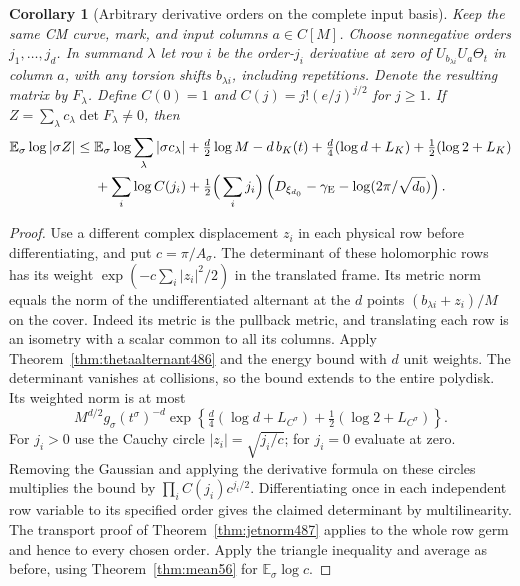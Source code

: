\documentclass[a4paper,11pt]{article}
\newtheorem{corollary}[proposition]{Corollary}
\theoremstyle{definition}
\theoremstyle{remark}
\numberwithin{equation}{section}
\begin{document}
\begin{corollary}[Arbitrary derivative orders on the complete input basis]\leavevmode
\label{cor:arbitraryorders488}
Keep the same CM curve, mark, and input columns \(a\in C[M]\).
Choose nonnegative orders \(j_1,\ldots,j_d\). In summand
\(\lambda\) let row \(i\) be the order-\(j_i\) derivative at zero
of \(U_{b_{\lambda i}}U_a\Theta_t\) in column \(a\), with any
torsion shifts \(b_{\lambda i}\), including repetitions. Denote
the resulting matrix by \(F_\lambda\). Define \(C(0)=1\) and
\(C(j)=j!(e/j)^{j/2}\) for \(j\ge1\). If
\(Z=\sum_\lambda c_\lambda\det F_\lambda\ne0\), then
\[
\begin{aligned}
 \mathbb E_\sigma\log|\sigma Z|\le{}&
 \mathbb E_\sigma\log\sum_\lambda|\sigma c_\lambda|
 +\tfrac d2\log M-d\,b_K(t)
 +\tfrac d4(\log d+L_K)+\tfrac12(\log2+L_K)\\
 &+\sum_i\log C(j_i)
 +\tfrac12\Big(\sum_i j_i\Big)
   \left(D_{\xi_{d_0}}-\gamma_{\rm E}
                         -\log(2\pi/\sqrt{d_0})\right).
\end{aligned}
\]
\end{corollary}
\begin{proof}
Use a different complex displacement \(z_i\) in each physical row
before differentiating, and put \(c=\pi/A_\sigma\).
The determinant of these holomorphic rows has its weight
\(\exp(-c\sum_i|z_i|^2/2)\) in the translated frame.
Its metric norm equals the norm of the undifferentiated
alternant at the \(d\) points \((b_{\lambda i}+z_i)/M\) on the
cover. Indeed its metric is the pullback metric, and translating
each row is an isometry with a scalar common to all its columns.
Apply Theorem~\ref{thm:thetaalternant486} and the energy bound
with \(d\) unit weights. The determinant vanishes at collisions,
so the bound extends to the entire polydisk. Its weighted norm
is at most
\[
 M^{d/2}g_\sigma(t^\sigma)^{-d}
  \exp\!\left\{ \tfrac d4(\log d+L_{C^\sigma})
                     +\tfrac12(\log2+L_{C^\sigma})\right\}.
\]
For \(j_i>0\) use the Cauchy circle \(|z_i|=\sqrt{j_i/c}\);
for \(j_i=0\) evaluate at zero. Removing the Gaussian and applying
the derivative formula on these circles multiplies the bound by
\(\prod_i C(j_i)c^{j_i/2}\). Differentiating once in each
independent row variable to its specified order gives the
claimed determinant by multilinearity. The transport proof of
Theorem~\ref{thm:jetnorm487} applies to the whole row germ and
hence to every chosen order. Apply the triangle inequality and
average as before, using Theorem~\ref{thm:mean56} for
\(\mathbb E_\sigma\log c\).
\end{proof}
\end{document}
